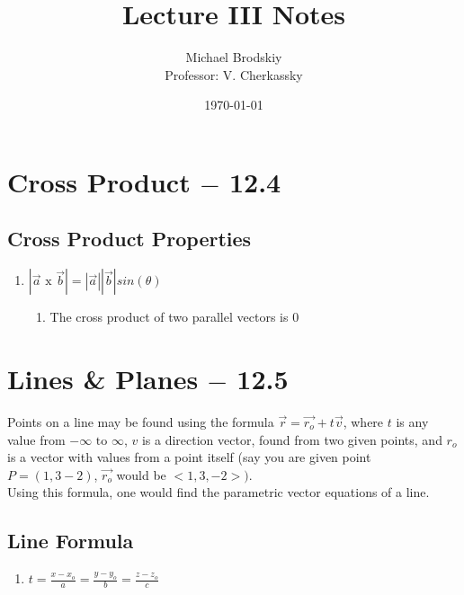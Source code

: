 \documentclass[12pt]{article}
\title{Lecture III Notes}
\date{\today}
\author{Michael Brodskiy\\ \small Professor: V. Cherkassky}
\begin{document}
\maketitle

\section{Cross Product $-$ 12.4}

\subsection{Cross Product Properties}

\begin{enumerate}

  \item $|\vec{a} \text{ x } \vec{b}| = |\vec{a}||\vec{b}|sin(\theta)$

    \begin{enumerate}

      \item The cross product of two parallel vectors is 0

    \end{enumerate}

\end{enumerate}

\section{Lines \& Planes $-$ 12.5}

Points on a line may be found using the formula $\vec{r} = \vec{r_o} + t\vec{v}$, where $t$ is any value from $-\infty \text{ to } \infty$, $v$ is a direction vector, found from two given points, and $r_o$ is a vector with values from a point itself (say you are given point $P = (1, 3 -2)$, $\vec{r_o}$ would be $<1, 3, -2>)$.\\

Using this formula, one would find the parametric vector equations of a line.

\subsection{Line Formula}

\begin{enumerate}

  \item $t=\frac{x-x_o}{a}=\frac{y-y_o}{b}=\frac{z-z_o}{c}$

\end{enumerate}
\end{document}
